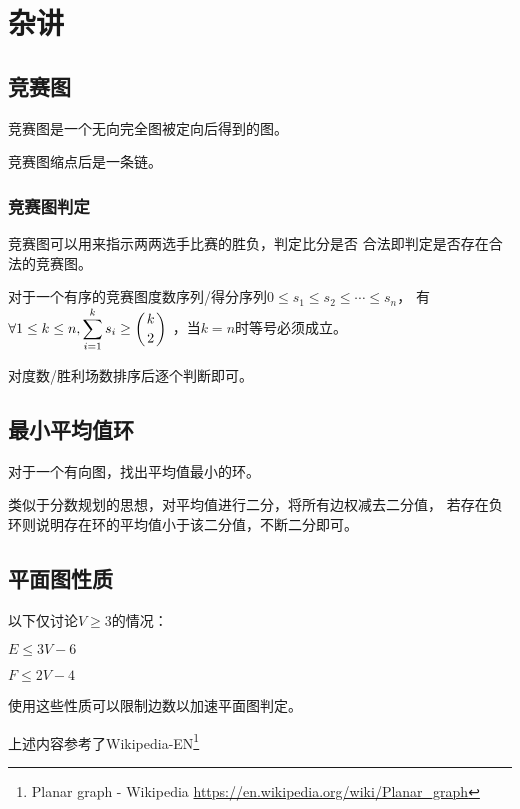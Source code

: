 \section{杂讲}
\subsection{竞赛图}
竞赛图是一个无向完全图被定向后得到的图。
\begin{theorem}
    竞赛图缩点后是一条链。
\end{theorem}
\subsubsection{竞赛图判定}
竞赛图可以用来指示两两选手比赛的胜负，判定比分是否
合法即判定是否存在合法的竞赛图。
\begin{theorem}
对于一个有序的竞赛图度数序列/得分序列$0\leq s_1 \leq s_2 \leq \cdots \leq s_n$，
有$\displaystyle \forall 1\leq k\leq n,\sum_{i=1}^k{s_i}\geq \left(k \atop 2\right)$
，当$k=n$时等号必须成立。
\end{theorem}
对度数/胜利场数排序后逐个判断即可。
\subsection{最小平均值环}
对于一个有向图，找出平均值最小的环。

类似于分数规划的思想，对平均值进行二分，将所有边权减去二分值，
若存在负环则说明存在环的平均值小于该二分值，不断二分即可。
\subsection{平面图性质}
以下仅讨论$V\geq 3$的情况：
\begin{property}
    $E\leq 3V-6$
\end{property}
\begin{property}
    $F\leq 2V-4$
\end{property}
使用这些性质可以限制边数以加速平面图判定。

上述内容参考了Wikipedia-EN\footnote{Planar graph - Wikipedia
    \url{https://en.wikipedia.org/wiki/Planar\_graph}
}
